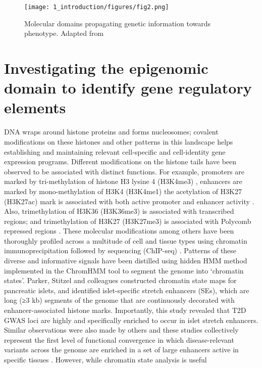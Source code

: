 \begin{figure}
        \centering
        \texttt{[image: 1\_introduction/figures/fig2.png]}
        \caption[Molecular domains propagating genetic information towards phenotype]{Molecular domains propagating genetic information towards phenotype. Adapted from \cite{civelekSystemsGeneticsApproaches2014}}
        \label{fig:ci_f2}
\end{figure}


\section{Investigating the epigenomic domain to identify gene regulatory elements}
DNA wraps around histone proteins and forms nucleosomes; covalent modifications on these histones and other patterns in this landscape helps establishing and maintaining relevant cell-specific and cell-identity gene expression programs. Different modifications on the histone tails have been observed to be associated with distinct functions. For example, promoters are marked by tri-methylation of histone H3 lysine 4 (H3K4me3) \cite{bernsteinBivalentChromatinStructure2006, mikkelsenGenomewideMapsChromatin2007,adliGenomewideChromatinMaps2010}, enhancers are marked by mono-methylation of H3K4 (H3K4me1) \cite{heintzmanDistinctPredictiveChromatin2007} the acetylation of H3K27 (H3K27ac) mark is associated with both active promoter and enhancer activity \cite{mikkelsenGenomewideMapsChromatin2007}. Also, trimethylation of H3K36 (H3K36me3) is associated with transcribed regions; and trimethylation of H3K27 (H3K27me3) is associated with Polycomb repressed regions \cite{heintzmanDistinctPredictiveChromatin2007, zhouChartingHistoneModifications2011}. These molecular modifications among others have been thoroughly profiled across a multitude of cell and tissue types using chromatin immunoprecipitation followed by sequencing (ChIP-seq) \cite{theencodeprojectconsortiumIntegratedEncyclopediaDNA2012, theroadmapepigenomicsconsortiumIntegrativeAnalysis1112015}. Patterns of these diverse and informative signals have been distilled using hidden \ac{HMM} method implemented in the ChromHMM tool \cite{ernstMappingAnalysisChromatin2011, ernstChromHMMAutomatingChromatin2012} to segment the genome into ‘chromatin states’. Parker, Stitzel and colleagues constructed chromatin state maps for pancreatic islets, and identified islet-specific stretch enhancers (SEs), which are long (≥3 kb) segments of the genome that are continuously decorated with enhancer-associated histone marks. Importantly, this study revealed that T2D GWAS loci are highly and specifically enriched to occur in islet stretch enhancers. Similar observations were also made by others and these studies collectively represent the first level of functional convergence in which disease-relevant variants across the genome are enriched in a set of large enhancers active in specific tissues \cite{theencodeprojectconsortiumIntegratedEncyclopediaDNA2012,mauranoSystematicLocalizationCommon2012,trynkaChromatinMarksIdentify2013,parkerChromatinStretchEnhancer2013,pasqualiPancreaticIsletEnhancer2014, quangMotifSignaturesStretch2015}. However, while chromatin state analysis is useful 